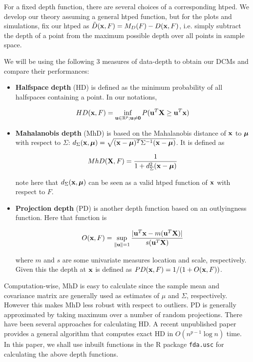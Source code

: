 \documentclass[fleqn,11pt]{article}
\begin{document}
For a fixed depth function, there are several choices of a corresponding htped. We develop our theory assuming a general htped function, but for the plots and simulations, fix our htped as $\tilde D({\bf{x}}, F) = M_D(F) - D({\bf{x}}, F)$, i.e. simply subtract the depth of a point from the maximum possible depth over all points in sample space.

We will be using the following 3 measures of data-depth to obtain our DCMs and compare their performances:

\begin{itemize}
\item \textbf{Halfspace depth} (HD) \citep{tukey75} is defined as the minimum probability of all halfspaces containing a point. In our notations,

$$ HD({\bf{x}}, F)  = \inf_{{\bf{u}} \in \mathbb{R}^p; {\bf{u}} \neq \bf0} P({\bf{u}}^T {\mathbf{X}} \geq {\bf{u}}^T {\bf{x}}) $$

\item \textbf{Mahalanobis depth} (MhD) \citep{LiuPareliusSingh99} is based on the Mahalanobis distance of ${\bf{x}}$ to ${\boldsymbol{\mu}}$ with respect to $\Sigma$: $d_\Sigma({\bf{x}}, {\boldsymbol{\mu}}) = \sqrt{({\bf{x}} - {\boldsymbol{\mu}})^T \Sigma^{-1} ({\bf{x}} - {\boldsymbol{\mu}})}$. It is defined as

$$ MhD({\mathbf{X}}, F) = \frac{1}{1 + d^2_\Sigma ({\bf{x}} - {\boldsymbol{\mu}})} $$

note here that $d_\Sigma({\bf{x}},{\boldsymbol{\mu}})$ can be seen as a valid htped function of ${\bf{x}}$ with respect to $F$.

\item \textbf{Projection depth} (PD) \citep{zuo03} is another depth function based on an outlyingness function. Here that function is

$$ O({\bf{x}}, F) = \sup_{\| {\bf{u}} \| = 1} \frac{| {\bf{u}}^T{\bf{x}} - m({\bf{u}}^T{\mathbf{X}})|}{s({\bf{u}}^T{\mathbf{X}})} $$

where $m$ and $s$ are some univariate measures location and scale, respectively. Given this the depth at ${\bf{x}}$ is defined as $PD({\bf{x}}, F) = 1/(1+O({\bf{x}}, F))$.
\end{itemize}

Computation-wise, MhD is easy to calculate since the sample mean and covariance matrix are generally used as estimates of $\mu$ and $\Sigma$, respectively. However this makes MhD less robust with respect to outliers. PD is generally approximated by taking maximum over a number of random projections. There have been several approaches for calculating HD. A recent unpublished paper \citep{rainerArxiv} provides a general algorithm that computes exact HD in $O(n^{p-1}\log n)$ time. In this paper, we shall use inbuilt functions in the R package \texttt{fda.usc} for calculating the above depth functions.
\end{document}
